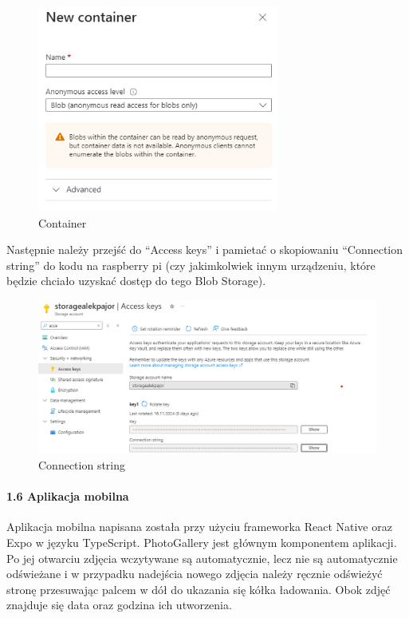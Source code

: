 \documentclass{article}
\begin{document}
\begin{figure}[H]
\centering
\includegraphics[width=3.125in,height=\textheight,keepaspectratio]{images/container.png}
\caption{Container}
\end{figure}

Następnie należy przejść do ``Access keys'' i pamietać o skopiowaniu
``Connection string'' do kodu na raspberry pi (czy jakimkolwiek innym
urządzeniu, które będzie chciało uzyskać dostęp do tego Blob Storage).

\begin{figure}[H]
\centering
\includegraphics[width=5.20833in,height=\textheight,keepaspectratio]{images/connection-string.png}
\caption{Connection string}
\end{figure}

\paragraph{1.6 Aplikacja mobilna}\label{aplikacja-mobilna}

Aplikacja mobilna napisana została przy użyciu frameworka React Native
oraz Expo w języku TypeScript. PhotoGallery jest głównym komponentem
aplikacji. Po jej otwarciu zdjęcia wczytywane są automatycznie, lecz nie
są automatycznie odświeżane i w przypadku nadejścia nowego zdjęcia
należy ręcznie odświeżyć stronę przesuwając palcem w dół do ukazania się
kółka ładowania. Obok zdjęć znajduje się data oraz godzina ich
utworzenia.
\end{document}
